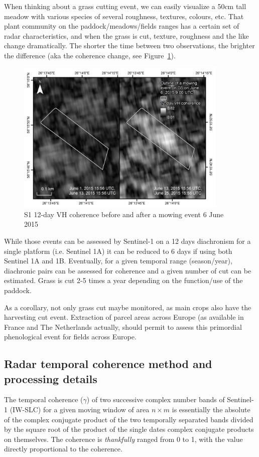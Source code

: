 \documentclass[a4paper,11.5pt,onecolumn]{article}
\begin{document}
When thinking about a grass cutting event, we can easily visualize a 50cm tall meadow with various species of several roughness, textures, colours, etc. That plant community on the paddock/meadows/fields ranges has a certain set of radar characteristics, and when the grass is cut, texture, roughness and the like change dramatically. The shorter the time between two observations, the brighter the difference (aka the coherence change, see Figure~\ref{fig8}).

\begin{figure}[htbp]
\begin{center}
\includegraphics[width=0.9\textwidth]{images/S1GrassCutEventCoherence.png}
\end{center}
\caption{S1 12-day VH coherence before and after a mowing event 6 June 2015 \citep{tamm2016relating}}
\label{fig8}
\end{figure}

While those events can be assessed by Sentinel-1 on a 12 days diachronism for a single platform (i.e. Sentinel 1A) it can be reduced to 6 days if using both Sentinel 1A and 1B. Eventually, for a given temporal range (season/year), diachronic pairs can be assessed for coherence and a given number of cut can be estimated. Grass is cut 2-5 times a year depending on the function/use of the paddock.

As a corollary, not only grass cut maybe monitored, as main crops also have the harvesting cut event. Extraction of parcel areas across Europe (as available in France and The Netherlands actually, should permit to assess this primordial phenological event for fields across Europe. 

\subsection{Radar temporal coherence method and processing details}
The temporal coherence ($\gamma$) of two successive complex number bands of Sentinel-1 (IW-SLC) for a given moving window of area $n \times m$ is essentially the absolute of the complex conjugate product of the two temporally separated bands divided by the square root of the product of the single dates complex conjugate products on themselves. The coherence is \textit{thankfully} ranged from 0 to 1, with the value directly proportional to the coherence.
\end{document}
